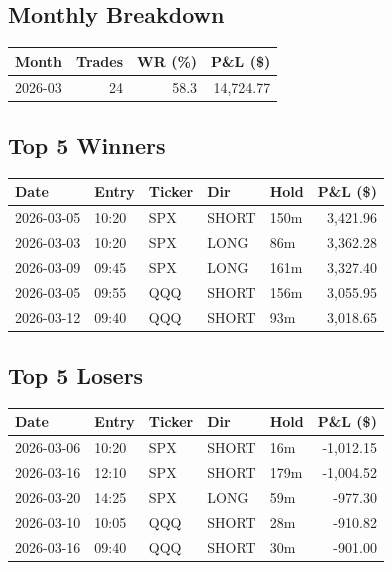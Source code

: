 \documentclass[11pt,a4paper,twoside]{article}
\begin{document}
\subsection{Monthly Breakdown}
\noindent\begin{center}
\begin{tabular}{>{\color{txtmain}}l rrr}
\toprule
\rowcolor{cardbg}
\textbf{Month} & \textbf{Trades} & \textbf{WR (\%)} & \textbf{P\&L (\$)} \\
\midrule
2026-03 & 24 & 58.3 & \textcolor{wingreen}{14,724.77} \\
\bottomrule
\end{tabular}
\end{center}
\subsection{Top 5 Winners}
\noindent\begin{center}
\begin{tabular}{>{\color{txtmain}}l llll r}
\toprule
\rowcolor{cardbg}
\textbf{Date} & \textbf{Entry} & \textbf{Ticker} & \textbf{Dir} & \textbf{Hold} & \textbf{P\&L (\$)} \\
\midrule
2026-03-05 & 10:20 & SPX & SHORT & 150m & \textcolor{wingreen}{3,421.96} \\
2026-03-03 & 10:20 & SPX & LONG & 86m & \textcolor{wingreen}{3,362.28} \\
2026-03-09 & 09:45 & SPX & LONG & 161m & \textcolor{wingreen}{3,327.40} \\
2026-03-05 & 09:55 & QQQ & SHORT & 156m & \textcolor{wingreen}{3,055.95} \\
2026-03-12 & 09:40 & QQQ & SHORT & 93m & \textcolor{wingreen}{3,018.65} \\
\bottomrule
\end{tabular}
\end{center}
\subsection{Top 5 Losers}
\noindent\begin{center}
\begin{tabular}{>{\color{txtmain}}l llll r}
\toprule
\rowcolor{cardbg}
\textbf{Date} & \textbf{Entry} & \textbf{Ticker} & \textbf{Dir} & \textbf{Hold} & \textbf{P\&L (\$)} \\
\midrule
2026-03-06 & 10:20 & SPX & SHORT & 16m & \textcolor{lossred}{-1,012.15} \\
2026-03-16 & 12:10 & SPX & SHORT & 179m & \textcolor{lossred}{-1,004.52} \\
2026-03-20 & 14:25 & SPX & LONG & 59m & \textcolor{lossred}{-977.30} \\
2026-03-10 & 10:05 & QQQ & SHORT & 28m & \textcolor{lossred}{-910.82} \\
2026-03-16 & 09:40 & QQQ & SHORT & 30m & \textcolor{lossred}{-901.00} \\
\bottomrule
\end{tabular}
\end{center}
\clearpage
\end{document}
